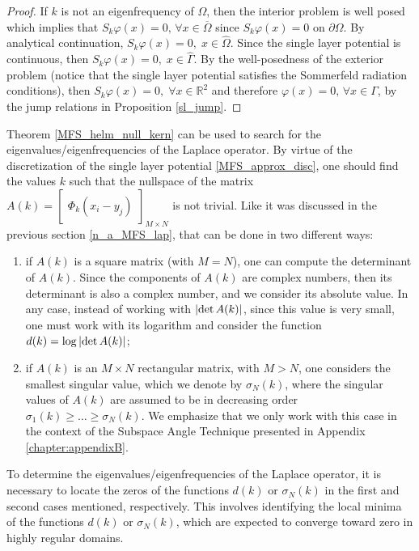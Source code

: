 \begin{proof}
    If \(k\) is not an eigenfrequency of \(\Omega\), then the interior problem is well posed which implies that \(S_k\varphi(x) = 0, \, \forall x \in \overline{\Omega}\) since \(S_k\varphi(x) = 0\) on \(\partial\Omega\). By analytical continuation, \(S_k\varphi(x) = 0, \; x \in \hat{\Omega}\). Since the single layer potential is continuous, then \(S_k\varphi(x) = 0, \; x \in \hat{\Gamma}\). By the well-posedness of the exterior problem (notice that the single layer potential satisfies the Sommerfeld radiation conditions), then \(S_k\varphi(x) = 0, \; \forall x \in \mathbb{R}^2\) and therefore \(\varphi(x) = 0, \, \forall x \in \Gamma\), by the jump relations in Proposition \ref{sl_jump}.
\end{proof}

Theorem \ref{MFS_helm_null_kern} can be used to search for the eigenvalues/eigenfrequencies of the Laplace operator. By virtue of the discretization of the single layer potential \eqref{MFS_approx_disc}, one should find the values \(k\) such that the nullspace of the matrix \(A(k) = \begin{bmatrix}
    \Phi_k(x_i - y_j)
\end{bmatrix}_{M \times N}\) is not trivial. Like it was discussed in the previous section \ref{n_a_MFS_lap}, that can be done in two different ways:
\begin{enumerate}
    \item if \(A(k)\) is a square matrix (with \(M=N\)), one can compute the determinant of \(A(k)\). Since the components of \(A(k)\) are complex numbers, then its determinant is also a complex number, and we consider its absolute value. In any case, instead of working with \(\abs{\determinant A(k)}\), since this value is very small, one must work with its logarithm and consider the function \(d(k) = \log \abs{\determinant A(k)}\);
    \item if \(A(k)\) is an \(M\times N\) rectangular matrix, with \(M > N\), one considers the smallest singular value, which we denote by \(\sigma_N(k)\), where the singular values of \(A(k)\) are assumed to be in decreasing order \(\sigma_1(k) \geq \dots \geq \sigma_N(k)\). We emphasize that we only work with this case in the context of the Subspace Angle Technique presented in Appendix \ref{chapter:appendixB}.
\end{enumerate}
    
To determine the eigenvalues/eigenfrequencies of the Laplace operator, it is necessary to locate the zeros of the functions \(d(k)\) or \(\sigma_N(k)\) in the first and second cases mentioned, respectively. This involves identifying the local minima of the functions \(d(k)\) or \(\sigma_N(k)\), which are expected to converge toward zero in highly regular domains.

